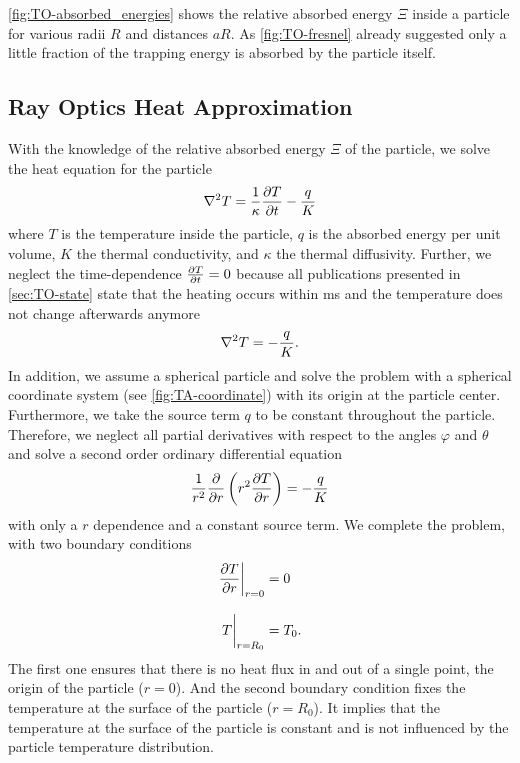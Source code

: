 \cref{fig:TO-absorbed_energies} shows the relative absorbed energy $\Xi$ inside 
a particle for various radii $R$ and distances $aR$. As \cref{fig:TO-fresnel} 
already suggested only a little fraction of the trapping energy is absorbed by 
the particle itself.

\subsection{Ray Optics Heat Approximation}

With the knowledge of the relative absorbed energy $\Xi$ of the particle, we 
solve the heat equation for the particle
\begin{equation}
  \laplacian{T} = \frac{1}{\kappa} \pdv{T}{t} - \frac{q}{K}
  \label{eq:TO-heat-prob}
\end{equation}
where $T$ is the temperature inside the particle, $q$ is the absorbed energy 
per unit volume, $K$ the thermal conductivity, and $\kappa$ the thermal 
diffusivity. Further, we neglect the time-dependence $\pdv{T}{t}= 0$ because 
all publications presented in \cref{sec:TO-state} state that the heating occurs 
within \si{\ms} and the temperature does not change afterwards anymore 
\begin{equation}
  \laplacian{T} = - \frac{q}{K}.
  \label{eq:TO-heat-stat}
\end{equation}
 In addition, we assume a spherical particle and solve the problem with a 
 spherical coordinate system (see \cref{fig:TA-coordinate}) with its origin at 
 the particle center. Furthermore, we take the source term $q$ to be constant 
 throughout the particle. Therefore, we neglect all partial derivatives with 
 respect to the angles $\varphi$ and $\theta$ and solve a second order ordinary 
 differential equation
 \begin{equation}
    \frac{1}{r^{2}}\pdv{r}\left( r^{2}\pdv{T}{r} \right) = - \frac{q}{K}
  \label{eq:TO-heat-spherical}
\end{equation}
with only a $r$ dependence and a constant source term. We complete the problem, 
with two boundary conditions
\begin{subequations}
\begin{align}
  \eval{\pdv{T}{r}}_{r=0} &= 0\\[3mm]
  \eval{T}_{r=R_{0}} &= T_{0}.
\end{align}
\end{subequations}
The first one ensures that there is no heat flux in and out of a single point, 
the origin of the particle ($r=0$). And the second boundary condition fixes the 
temperature at the surface of the particle ($r=R_{0}$). It implies that the 
temperature at the surface of the particle is constant and is not influenced by 
the particle temperature distribution.

